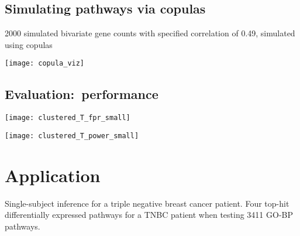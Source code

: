 \documentclass[a0,portrait]{a0poster}
\begin{document}
\begin{multicols}{3}

\subsection{Simulating pathways via copulas}
2000 simulated bivariate gene counts with specified correlation of 0.49, simulated using copulas\cite{Genest2007,Yan2007}
\begin{center}\vspace{1cm}
\texttt{[image: copula\_viz]}
\end{center}\vspace{1cm}


\subsection{Evaluation:~performance}
\begin{center}\vspace{1cm}
\texttt{[image: clustered\_T\_fpr\_small]}
\end{center}\vspace{1cm}

\begin{center}\vspace{1cm}
\texttt{[image: clustered\_T\_power\_small]}
\end{center}\vspace{0.2cm}

\section{Application}

Single-subject inference for a triple negative breast cancer patient.
 Four top-hit differentially expressed pathways for a TNBC patient when testing 3411 GO-BP pathways.


\end{multicols}
\end{document}
